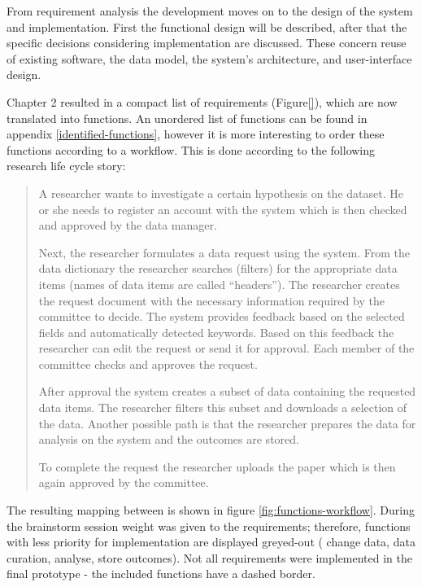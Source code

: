 From requirement analysis the development moves on to the design of the system and implementation.
First the functional design will be described, after that the specific decisions considering implementation are discussed.
These concern reuse of existing software, the data model, the system's architecture, and user-interface design.

Chapter 2 resulted in a compact list of requirements (Figure\ref{}), which are now translated into functions.
An unordered list of functions can be found in appendix \ref{identified-functions}, however it is more interesting to order these functions according to a workflow.
This is done according to the following research life cycle story:

\begin{quotation}
	\noindent{} A researcher wants to investigate a certain hypothesis on the \project{} dataset.
	He or she needs to register an account with the system which is then checked and approved by the data manager.
	
	Next, the researcher formulates a data request using the system.
	From the data dictionary the researcher searches (filters) for the appropriate data items (names of data items are called ``headers'').
	The researcher creates the request document with the necessary information required by the committee to decide.
	The system provides feedback based on the selected fields and automatically detected keywords.
	Based on this feedback the researcher can edit the request or send it for approval.
	Each member of the committee checks and approves the request.
	
	After approval the system creates a subset of \project{} data containing the requested data items.
	The researcher filters this subset and downloads a selection of the data.
	Another possible path is that the researcher prepares the data for analysis on the system and the outcomes are stored.
	
	To complete the request the researcher uploads the paper which is then again approved by the committee.
\end{quotation}

\noindent{}The resulting mapping between  is shown in figure \ref{fig:functions-workflow}.
During the brainstorm session weight was given to the requirements; therefore, functions with less priority for  implementation are displayed greyed-out (\ie{} change data, data curation, analyse, store outcomes).
Not all requirements were implemented in the final prototype - the included functions  have a dashed border.

